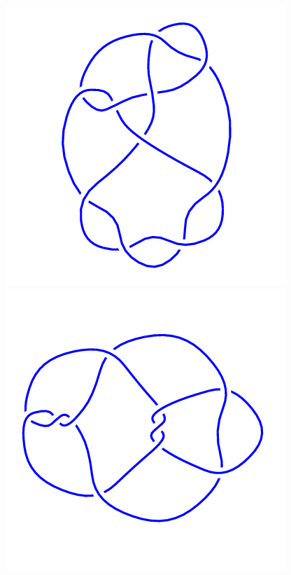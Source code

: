 \begin{figure}[H]
\begin{minipage}[b]{.18\linewidth}
	\end{minipage}
	\begin{minipage}[b]{.18\linewidth}
		\centering
		\includegraphics[width=\linewidth]{../data/10_49.png}
	\end{minipage}
	\begin{minipage}[b]{.18\linewidth}
		\centering
		\includegraphics[width=\linewidth]{../data/10_50.png}

\end{minipage}
\end{figure}
